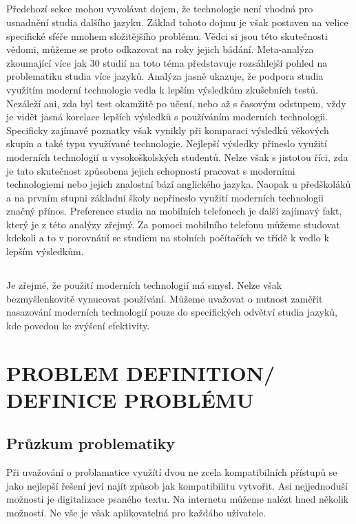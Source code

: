 \documentclass[journal]{IEEEtran}
\begin{document}
\subsection{}
Předchozí sekce mohou vyvolávat dojem, že technologie není vhodná pro usnadnění studia dalšího jazyku. Základ tohoto dojmu je však postaven na velice specifické sféře mnohem složitějšího problému. Vědci si jsou této skutečnosti vědomi, můžeme se proto odkazovat na roky jejich bádání.
Meta-analýza zkoumající více jak 30 studií na toto téma představuje rozsáhlejší pohled na problematiku studia více jazyků\cite{technology_vocab}. Analýza jasně ukazuje, že podpora studia využitím moderní technologie vedla k lepším výsledkům zkušebních testů. Nezáleží ani, zda byl test okamžitě po učení, nebo až s časovým odstupem, vždy je vidět jasná korelace lepších výsledků s používáním moderních technologii. Specificky zajímavé poznatky však vynikly při komparaci výsledků věkových skupin a také typu využívané technologie. Nejlepší výsledky přineslo využití moderních technologií u vysokoškolských studentů.
Nelze však s jistotou říci, zda je tato skutečnost způsobena jejich schopností pracovat s moderními technologiemi nebo jejich znalostní bází anglického jazyka.
Naopak u předškoláků a na prvním stupni základní školy nepřineslo využití moderních technologii značný přínos.
Preference studia na mobilních telefonech je další zajímavý fakt, který je z této analýzy zřejmý.
Za pomoci mobilního telefonu můžeme studovat kdekoli a to v porovnání se studiem na stolních počítačích ve třídě k vedlo k lepším výsledkům.

\subsection{}
Je zřejmé, že použití moderních technologií má smysl.
Nelze však bezmyšlenkovitě vynucovat používání.
Můžeme uvažovat o nutnost zaměřit nasazování moderních technologií pouze do specifických odvětví studia jazyků, kde povedou ke zvýšení efektivity.

\section{PROBLEM DEFINITION/ DEFINICE PROBLÉMU}

\subsection{Průzkum problematiky}
Při uvažování o problamatice využítí dvou ne zcela kompatibilních přístupů se jako nejlepší řešení jeví najít způsob jak kompatibilitu vytvořit.
Asi nejjednoduší možnosti je digitalizace psaného textu. Na internetu můžeme nalézt hned několik možností. Ne vše je však aplikovatelná pro každáho uživatele.\cite{aarp_digitalization, popupalr_science_digitalization_with_pens}
\end{document}
